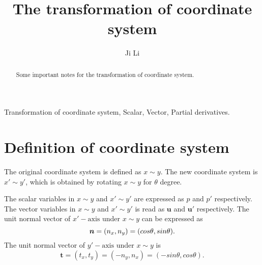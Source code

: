 \documentclass[review]{elsarticle}
\begin{document}
\begin{frontmatter}

\title{The transformation of coordinate system}

\author[mysecondaryaddress]{Ji Li}
\address{National Key Laboratory of Science and Technology on Aerodynamic Design and Research, Northwestern Polytechnical University, Xi'an, Shaanxi 710072, China}
\begin{abstract}
	Some important notes for the transformation of coordinate system.
\end{abstract}

\begin{keyword}
	Transformation of coordinate system, Scalar, Vector, Partial derivatives.
\end{keyword}

\end{frontmatter}

\linenumbers

\section{Definition of coordinate system}
The original coordinate system is defined as $x\sim y$. The new coordinate system is $x' \sim y'$, which 
is obtained by rotating $x \sim y$ for $\theta$ degree.

The scalar variables in $x \sim y$ and $x' \sim y'$ are expressed as $p$ and $p'$ respectively. The vector variables in $x \sim y$ and $x' \sim y'$ is read as $\bm{u}$ and $\bm{u}'$ respectively.
The unit normal vector of $x'-\text{axis}$ under $x \sim y$ can be expressed as
\begin{equation}\label{normal}
	\bm{n}=(n_x, n_y) = (cos\theta, sin\theta).\\
\end{equation}
The unit normal vector of $y'-\text{axis}$ under $x \sim y$ is
\begin{equation}\label{tangent}
	\bm{t} = (t_x, t_y) = (-n_y, n_x)=(-sin\theta, cos\theta).
\end{equation}
\end{document}

